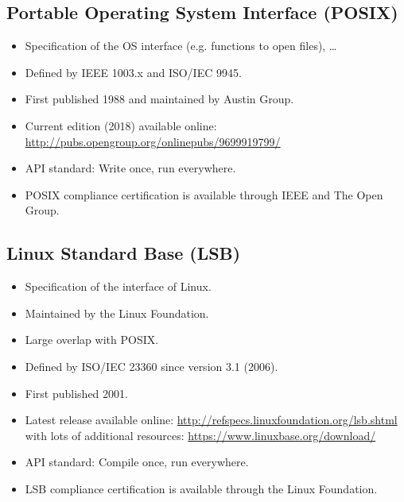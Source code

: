 \documentclass[a4paper, 11pt, accentcolor = tud3b]{tudreport}
\newcommand{\HREF}[1]{\href{#1}{#1}}
\begin{document}
            \subsection{Portable Operating System Interface (POSIX)}
	            \begin{itemize}
	            	\item Specification of the OS interface (e.g. functions to open files), \dots
	            	\item Defined by IEEE 1003.x and ISO/IEC 9945.
	            	\item First published 1988 and maintained by Austin Group.
	            	\item Current edition (2018) available online: \HREF{http://pubs.opengroup.org/onlinepubs/9699919799/}
	            	\item API standard: Write once, run everywhere.
	            	\item POSIX compliance certification is available through IEEE and The Open Group.
	            \end{itemize}

            \subsection{Linux Standard Base (LSB)}
                \begin{itemize}
                	\item Specification of the interface of Linux.
                	\item Maintained by the Linux Foundation.
                	\item Large overlap with POSIX.
                	\item Defined by ISO/IEC 23360 since version 3.1 (2006).
                	\item First published 2001.
                	\item Latest release available online: \HREF{http://refspecs.linuxfoundation.org/lsb.shtml} with lots of additional resources: \HREF{https://www.linuxbase.org/download/}
                	\item API standard: Compile once, run everywhere.
                	\item LSB compliance certification is available through the Linux Foundation.
                \end{itemize}
\end{document}
